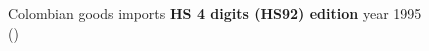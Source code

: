 \documentclass[
  ignorenonframetext,
]{beamer}
\begin{document}
\begin{frame}{}
\label{section-8}
\begin{figure}


\caption{\label{fig-colombian-goods-imports-1995}Colombian goods imports
\textbf{HS 4 digits (HS92) edition} year 1995
()}

\end{figure}%
\end{frame}
\end{document}
